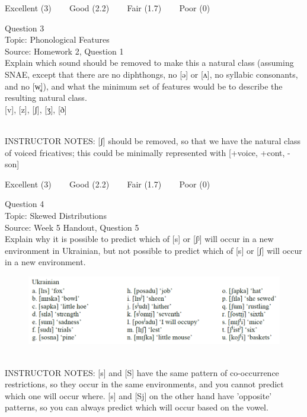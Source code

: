 \documentclass[12pt]{article}
\begin{document}
\vfill
Excellent (3) ~~~ Good (2.2) ~~~ Fair (1.7) ~~~ Poor (0)
\newpage

{\large Question 3}\\

Topic: Phonological Features\\
Source: Homework 2, Question 1\\

Explain which sound should be removed to make this a natural class (assuming SNAE, except that there are no diphthongs, no [ə] or [ʌ], no syllabic consonants, and no [w̥]), and what the minimum set of features would be to describe the resulting natural class.\\

{[v]}, {[z]}, {[ʃ]}, {[ʒ]}, {[ð]}


~\\
INSTRUCTOR NOTES: [ʃ] should be removed, so that we have the natural class of voiced fricatives; this could be minimally represented with [+voice, +cont, -son]


\vfill
Excellent (3) ~~~ Good (2.2) ~~~ Fair (1.7) ~~~ Poor (0)
\newpage

{\large Question 4}\\

Topic: Skewed Distributions\\
Source: Week 5 Handout, Question 5\\

Explain why it is possible to predict which of [s] or [ʃʲ] will occur in a new environment in Ukrainian, but not possible to predict which of [s] or [ʃ] will occur in a new environment.\\

\begin{figure}[H]
\includegraphics{../images/ukrainian.png}
\end{figure}

~\\
INSTRUCTOR NOTES: [s] and [S] have the same pattern of co-occurrence restrictions, so they occur in the same environments, and you cannot predict which one will occur where. [s] and [Sj] on the other hand have 'opposite' patterns, so you can always predict which will occur based on the vowel.
\end{document}
